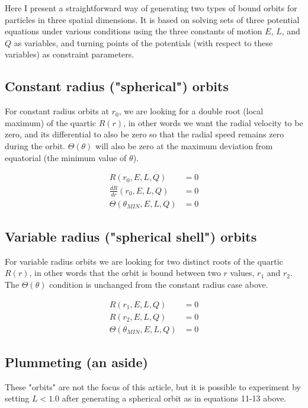 \documentclass[11pt]{article}
\begin{document}
Here I present a straightforward way of generating two types of bound orbits for particles in three spatial dimensions.
It is based on solving sets of three potential equations under various conditions using the three constants of motion $E$, $L$, and $Q$ as variables, and turning points of the potentials (with respect to these variables) as constraint parameters.

\subsection{Constant radius ("spherical") orbits}

For constant radius orbits at $r_0$, we are looking for a double root (local maximum) of the quartic $R(r)$, in other words we want the radial velocity to be zero, and its differential to also be zero so that the radial speed remains zero during the orbit.
$\Theta (\theta)$ will also be zero at the maximum deviation from equatorial (the minimum value of $\theta$).

\begin{align}
R(r_0, E, L, Q) &= 0 \\
\frac{d R}{d r} (r_0, E, L, Q) &= 0 \\
\Theta(\theta_{MIN}, E, L, Q) &= 0
\end{align}

\subsection{Variable radius ("spherical shell") orbits}

For variable radius orbits we are looking for two distinct roots of the quartic $R(r)$, in other words that the orbit is bound between two $r$ values, $r_1$ and $r_2$.
The $\Theta (\theta)$ condition is unchanged from the constant radius case above.

\begin{align}
R(r_1, E, L, Q) &= 0 \\
R(r_2, E, L, Q) &= 0 \\
\Theta(\theta_{MIN}, E, L, Q) &= 0
\end{align}

\subsection{Plummeting (an aside)}

These "orbits" are not the focus of this article, but it is possible to experiment by setting $L < 1.0$ after generating a spherical orbit as in equations 11-13 above.
\end{document}
